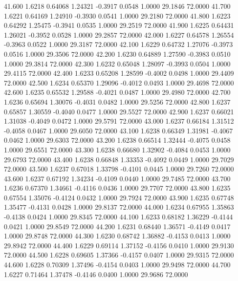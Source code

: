   41.600   1.6218   0.64068   1.24321  -0.3917   0.0548   1.0000  29.1846  72.0000
  41.700   1.6221   0.64169   1.24910  -0.3930   0.0541   1.0000  29.2180  72.0000
  41.800   1.6223   0.64292   1.25475  -0.3941   0.0535   1.0000  29.2519  72.0000
  41.900   1.6225   0.64431   1.26021  -0.3952   0.0528   1.0000  29.2857  72.0000
  42.000   1.6227   0.64578   1.26554  -0.3963   0.0522   1.0000  29.3187  72.0000
  42.100   1.6229   0.64732   1.27076  -0.3973   0.0516   1.0000  29.3506  72.0000
  42.200   1.6230   0.64889   1.27590  -0.3983   0.0510   1.0000  29.3814  72.0000
  42.300   1.6232   0.65048   1.28097  -0.3993   0.0504   1.0000  29.4115  72.0000
  42.400   1.6233   0.65208   1.28599  -0.4002   0.0498   1.0000  29.4409  72.0000
  42.500   1.6234   0.65370   1.29096  -0.4012   0.0493   1.0000  29.4698  72.0000
  42.600   1.6235   0.65532   1.29588  -0.4021   0.0487   1.0000  29.4980  72.0000
  42.700   1.6236   0.65694   1.30076  -0.4031   0.0482   1.0000  29.5256  72.0000
  42.800   1.6237   0.65857   1.30559  -0.4040   0.0477   1.0000  29.5527  72.0000
  42.900   1.6237   0.66021   1.31038  -0.4049   0.0472   1.0000  29.5791  72.0000
  43.000   1.6237   0.66184   1.31512  -0.4058   0.0467   1.0000  29.6050  72.0000
  43.100   1.6238   0.66349   1.31981  -0.4067   0.0462   1.0000  29.6303  72.0000
  43.200   1.6238   0.66514   1.32444  -0.4075   0.0458   1.0000  29.6551  72.0000
  43.300   1.6238   0.66680   1.32902  -0.4084   0.0453   1.0000  29.6793  72.0000
  43.400   1.6238   0.66848   1.33353  -0.4092   0.0449   1.0000  29.7029  72.0000
  43.500   1.6237   0.67018   1.33798  -0.4101   0.0445   1.0000  29.7260  72.0000
  43.600   1.6237   0.67192   1.34234  -0.4109   0.0440   1.0000  29.7485  72.0000
  43.700   1.6236   0.67370   1.34661  -0.4116   0.0436   1.0000  29.7707  72.0000
  43.800   1.6235   0.67554   1.35076  -0.4124   0.0432   1.0000  29.7924  72.0000
  43.900   1.6235   0.67748   1.35477  -0.4131   0.0428   1.0000  29.8137  72.0000
  44.000   1.6234   0.67955   1.35863  -0.4138   0.0424   1.0000  29.8345  72.0000
  44.100   1.6233   0.68182   1.36229  -0.4144   0.0421   1.0000  29.8549  72.0000
  44.200   1.6231   0.68440   1.36571  -0.4149   0.0417   1.0000  29.8748  72.0000
  44.300   1.6230   0.68742   1.36882  -0.4153   0.0413   1.0000  29.8942  72.0000
  44.400   1.6229   0.69114   1.37152  -0.4156   0.0410   1.0000  29.9130  72.0000
  44.500   1.6228   0.69605   1.37366  -0.4157   0.0407   1.0000  29.9315  72.0000
  44.600   1.6228   0.70309   1.37496  -0.4154   0.0403   1.0000  29.9498  72.0000
  44.700   1.6227   0.71464   1.37478  -0.4146   0.0400   1.0000  29.9686  72.0000
